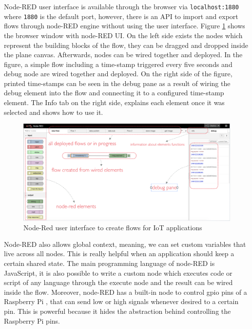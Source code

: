 \noindent Node-RED user interface is available through the browser via \verb|localhost:1880| where \verb|1880| is the default port, however, there is an API to import and export flows through node-RED engine without using the user interface. Figure \ref{fig:node-red} shows the browser window with node-RED UI. On the left side exists the nodes which represent the building blocks of the flow, they can be dragged and dropped inside the plane canvas. Afterwards, nodes can be wired together and deployed. In the figure, a simple flow including a time-stamp triggered every five seconds and debug node are wired together and deployed. On the right side of the figure, printed time-stamps can be seen in the debug pane as a result of wiring the debug element into the flow and connecting it to a configured time-stamp element. The Info tab on the right side, explains each element once it was selected and shows how to use it.


\begin{figure}[H]
	\centering
	\includegraphics[scale=0.5]{images/node-red.png}
	\caption{Node-Red user interface to create  flows for IoT applications}
	\label{fig:node-red}
\end{figure}


\noindent Node-RED also allows global context, meaning, we can set custom variables that live across all nodes. This is really helpful when  an application should keep a certain shared state. The main programming language of node-RED is JavaScript, it is also possible to write a custom node which executes code or script of any language through the execute node and the result can be  wired inside the flow. Moreover, node-RED has a built-in node to control gpio pins of a Raspberry Pi , that can send low or high signals whenever desired to a certain pin. This is powerful because it hides the abstraction behind controlling the Raspberry Pi  pins.\\


